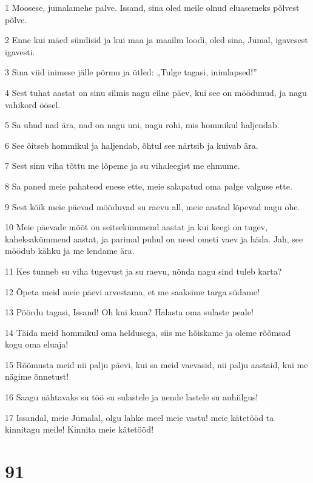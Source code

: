 \par 1 Moosese, jumalamehe palve. Issand, sina oled meile olnud eluasemeks põlvest põlve.
\par 2 Enne kui mäed sündisid ja kui maa ja maailm loodi, oled sina, Jumal, igavesest igavesti.
\par 3 Sina viid inimese jälle põrmu ja ütled: „Tulge tagasi, inimlapsed!”
\par 4 Sest tuhat aastat on sinu silmis nagu eilne päev, kui see on möödunud, ja nagu vahikord öösel.
\par 5 Sa uhud nad ära, nad on nagu uni, nagu rohi, mis hommikul haljendab.
\par 6 See õitseb hommikul ja haljendab, õhtul see närtsib ja kuivab ära.
\par 7 Sest sinu viha tõttu me lõpeme ja su vihaleegist me ehmume.
\par 8 Sa paned meie pahateod enese ette, meie salapatud oma palge valguse ette.
\par 9 Sest kõik meie päevad mööduvad su raevu all, meie aastad lõpevad nagu ohe.
\par 10 Meie päevade mõõt on seitsekümmend aastat ja kui keegi on tugev, kaheksakümmend aastat, ja parimal puhul on need ometi vaev ja häda. Jah, see möödub kähku ja me lendame ära.
\par 11 Kes tunneb su viha tugevust ja su raevu, nõnda nagu sind tuleb karta?
\par 12 Õpeta meid meie päevi arvestama, et me saaksime targa südame!
\par 13 Pöördu tagasi, Issand! Oh kui kaua? Halasta oma sulaste peale!
\par 14 Täida meid hommikul oma heldusega, siis me hõiskame ja oleme rõõmsad kogu oma eluaja!
\par 15 Rõõmusta meid nii palju päevi, kui sa meid vaevasid, nii palju aastaid, kui me nägime õnnetust!
\par 16 Saagu nähtavaks su töö su sulastele ja nende lastele su auhiilgus!
\par 17 Issandal, meie Jumalal, olgu lahke meel meie vastu! meie kätetööd ta kinnitagu meile! Kinnita meie kätetööd!

\chapter{91}

